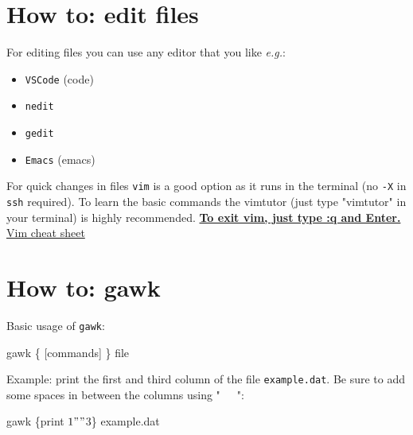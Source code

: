 \documentclass[
  letterpaper,
]{article}
\newenvironment{Shaded}{\begin{snugshade}}{\end{snugshade}}
\newcommand{\FunctionTok}[1]{\textcolor[rgb]{0.28,0.35,0.67}{#1}}
\newcommand{\NormalTok}[1]{\textcolor[rgb]{0.00,0.23,0.31}{#1}}
\newcommand{\StringTok}[1]{\textcolor[rgb]{0.13,0.47,0.30}{#1}}
\begin{document}
\hypertarget{how-to-edit-files}{%
\section*{How to: edit files}\label{how-to-edit-files}}


For editing files you can use any editor that you like \emph{e.g.}:

\begin{itemize}
\item
  \texttt{VSCode} (code)
\item
  \texttt{nedit}
\item
  \texttt{gedit}
\item
  \texttt{Emacs} (emacs)
\end{itemize}

For quick changes in files \texttt{vim} is a good option as it runs in
the terminal (no \texttt{-X} in \texttt{ssh} required). To learn the
basic commands the vimtutor (just type "vimtutor" in your terminal) is
highly recommended.
\href{https://stackoverflow.com/questions/11828270/how-do-i-exit-vim}{\textbf{To
exit vim, just type :q and Enter.}}\\

\href{https://github.com/LeCoupa/awesome-cheatsheets/blob/master/tools/vim.txt}{Vim
cheat sheet}\\

\hypertarget{how-to-gawk}{%
\section*{How to: gawk}\label{how-to-gawk}}


Basic usage of \texttt{gawk}:

\begin{Shaded}
\begin{Highlighting}[]
\NormalTok{gawk \textquotesingle{}\{ [commands] \}\textquotesingle{} file}
\end{Highlighting}
\end{Shaded}

Example: print the first and third column of the file
\texttt{example.dat}. Be sure to add some spaces in between the columns
using "~~~":

\begin{Shaded}
\begin{Highlighting}[]
\FunctionTok{gawk} \StringTok{\textquotesingle{}\{print $1"   "$3\}\textquotesingle{}}\NormalTok{ example.dat}
\end{Highlighting}
\end{Shaded}
\end{document}
